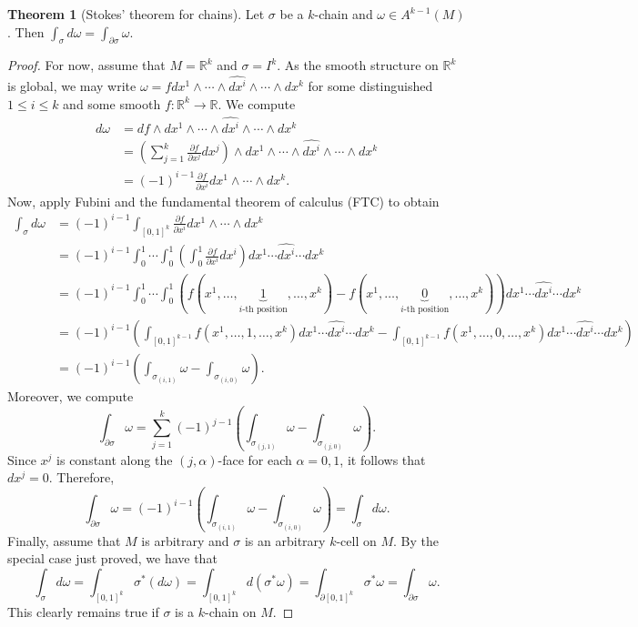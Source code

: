 \documentclass[10pt,letterpaper,cm]{nupset}
\theoremstyle{definition}
\theoremstyle{theorem}
\newtheorem{theorem}[definition]{Theorem}
\theoremstyle{remark}
\newcommand{\R}{\mathbb R}
\newcommand{\1}{\mathbf{1}}
\newcommand{\0}{\vec 0}
\begin{document}
\begin{theorem}[Stokes' theorem for chains]
Let $\sigma$ be a $k$-chain and $\omega \in A^{k-1}(M)$. Then $\int_{\sigma} d\omega = \int_{\partial{\sigma}} \omega$.
\end{theorem}
\begin{proof}
For now, assume that $M= \R^k$ and $\sigma = I^k$. As the smooth structure on $\R^k$ is global, we may write $\omega = fdx^1 \wedge \cdots \wedge \widehat{dx^i} \wedge \cdots \wedge dx^k$ for some distinguished $1\leq i \leq k$ and some smooth $f: \R^k \to \R$. We compute 
\begin{align*}
 d\omega & = df \wedge dx^1 \wedge \cdots \wedge \widehat{dx^i} \wedge \cdots \wedge dx^k
\\ & = \left(\sum_{j=1}^k\frac{\partial{f}}{\partial{x^j}}dx^j \right)\wedge dx^1 \wedge \cdots \wedge \widehat{dx^i} \wedge \cdots \wedge dx^k
\\ & = (-1)^{i-1} \frac{\partial{f}}{\partial{x^i}}dx^1 \wedge \cdots \wedge dx^k.
\end{align*}
Now, apply Fubini and the fundamental theorem of calculus (FTC) to obtain
\begin{align*}
 \int_{\sigma}d\omega & = (-1)^{i-1}\int_{[0,1]^k} \frac{\partial{f}}{\partial{x^i}}dx^1 \wedge \cdots \wedge dx^k
\\ & = (-1)^{i-1}\int_0^1 \cdots \int_0^1 \left(\int_0^1  \frac{\partial{f}}{\partial{x^i}}dx^i \right)dx^1 \cdots \widehat{dx^i}  \cdots dx^k
\\ & = (-1)^{i-1}\int_0^1 \cdots \int_0^1(f(x^1, \ldots, \underbrace{1}_{i\text{-th position}}, \ldots, x^k) - f(x^1, \ldots, \underbrace{0}_{i\text{-th position}}, \ldots, x^k))dx^1 \cdots \widehat{dx^i}  \cdots dx^k
\\ & =  (-1)^{i-1}\left( \int_{[0,1]^{k-1}} f(x^1, \ldots, 1, \ldots, x^k)dx^1 \cdots \widehat{dx^i}  \cdots dx^k -\int_{[0,1]^{k-1}}f(x^1, \ldots, 0, \ldots, x^k)dx^1 \cdots \widehat{dx^i}  \cdots dx^k \right)
\\ & = (-1)^{i-1}\left(\int_{\sigma_{(i, 1)}}\omega - \int_{\sigma_{(i, 0)}}\omega \right) .
\end{align*}
Moreover, we compute
$$ \int_{\partial{\sigma}}\omega = \sum_{j=1}^k(-1)^{j-1}\left(\int_{\sigma_{(j, 1)}}\omega - \int_{\sigma_{(j, 0)}}\omega \right).$$
Since $x^j$ is constant along the $(j, \alpha)$-face for each $\alpha = 0, 1$, it follows that $dx^j = 0$. Therefore, $$ \int_{\partial{\sigma}}\omega =   (-1)^{i-1}\left(\int_{\sigma_{(i, 1)}}\omega - \int_{\sigma_{(i, 0)}}\omega \right) = \int_{\sigma} d\omega.$$
Finally, assume that $M$ is arbitrary and $\sigma $ is an arbitrary $k$-cell on $M$. By the special case just proved, we have that
$$  \int_{\sigma}d\omega = \int_{[0,1]^k}\sigma^{\ast}(d\omega) = \int_{[0,1]^k}d(\sigma^{\ast}\omega) = \int_{\partial{[0,1]^k}}\sigma^{\ast} \omega = \int_{\partial{\sigma}} \omega .$$
This clearly remains true if $\sigma$ is a $k$-chain on $M$.
\end{proof}
\end{document}

